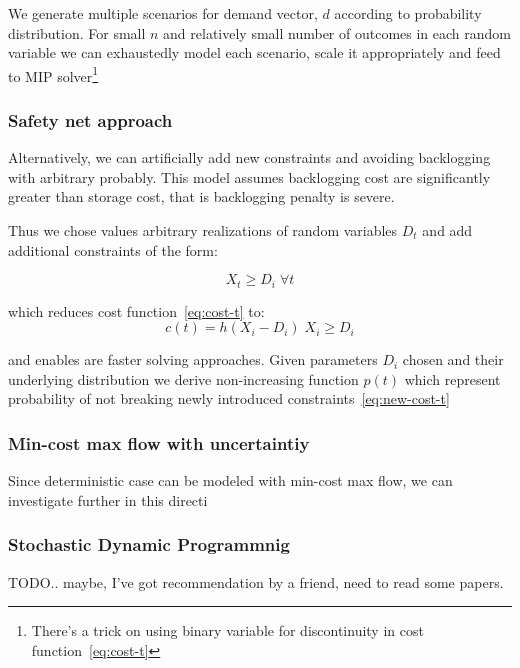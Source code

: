 We generate multiple scenarios for demand vector, $d$ according to probability distribution. For small $n$ and relatively small number of outcomes in each random variable we can exhaustedly model each scenario, scale it appropriately and feed to MIP solver\footnote{There's a trick on using binary variable for discontinuity in cost function~\ref{eq:cost-t}}

\subsubsection{Safety net approach}
\label{subs:Safety net approach}

Alternatively, we can artificially add new constraints and avoiding backlogging with arbitrary probably. This model assumes backlogging cost are significantly greater than storage cost, that is backlogging penalty is severe.

Thus we chose values arbitrary realizations of random variables $D_t$ and add additional constraints of the form:

\begin{equation}
    \label{eq:new-cost-t}
    X_t \ge D_i \; \forall t
\end{equation}

which reduces cost function~\ref{eq:cost-t} to:
\[
c(t) = h \left( X_i - D_i \right) \; X_i \ge D_i
\]

and enables are faster solving approaches. Given parameters $D_i$ chosen and their underlying distribution we derive non-increasing function $p(t)$ which represent probability of not breaking newly introduced constraints~\ref{eq:new-cost-t}

\subsubsection{Min-cost max flow with uncertaintiy}
\label{subs:Min-cost max flow with uncertaintiy}

Since deterministic case can be modeled with min-cost max flow, we can investigate further in this directi

\subsubsection{Stochastic Dynamic Programmnig}
\label{subs:SDP}

TODO.. maybe, I've got recommendation by a friend, need to read some papers.
